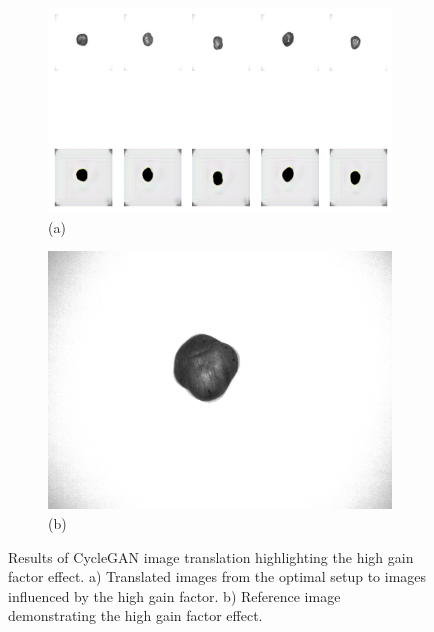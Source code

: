\documentclass[12pt,DIV14,BCOR12mm,a4paper,footinclude=false,headinclude,parskip=half-,twoside,openright,cleardoublepage=empty,toc=index,bibliography=totoc,listof=totoc]{scrreprt}
\numberwithin{equation}{chapter}
\begin{document}
\begin{figure}
    \centering
    \begin{subfigure}[b]{1.0\textwidth}
        \centering
        \includegraphics[width=\textwidth]{../media/high_gain.png}
        \caption*{(a)}
    \end{subfigure}
    \hfill
    \begin{subfigure}[b]{0.25\textwidth}
        \centering
        \includegraphics[width=\textwidth]{../media/high_gain_real.png}
        \caption*{(b)}
    \end{subfigure}
    \caption{Results of CycleGAN image translation highlighting the high gain factor effect. a) Translated images from the optimal setup to images influenced by the high gain factor. b) Reference image demonstrating the high gain factor effect.}
    \label{fig:high_gain_factor_result}
\end{figure}
\end{document}
